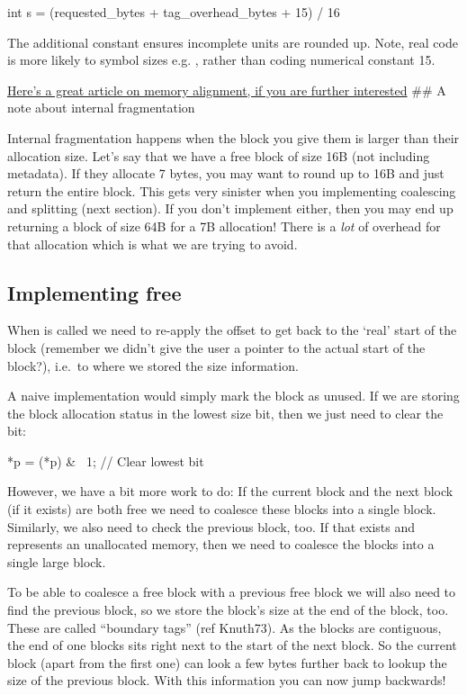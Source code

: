 \begin{code}[language=C]
int s = (requested_bytes + tag_overhead_bytes + 15) / 16
\end{code}

The additional constant ensures incomplete units are rounded up. Note, real code is more likely to symbol sizes e.g. , rather than coding numerical constant 15.

\href{http://www.ibm.com/developerworks/library/pa-dalign/}{Here's a great article on memory alignment, if you are further interested} \#\# A note about internal fragmentation

Internal fragmentation happens when the block you give them is larger than their allocation size. Let's say that we have a free block of size 16B (not including metadata). If they allocate 7 bytes, you may want to round up to 16B and just return the entire block. This gets very sinister when you implementing coalescing and splitting (next section). If you don't implement either, then you may end up returning a block of size 64B for a 7B allocation! There is a \emph{lot} of overhead for that allocation which is what we are trying to avoid.

\subsection{Implementing free}

When  is called we need to re-apply the offset to get back to the `real' start of the block (remember we didn't give the user a pointer to the actual start of the block?), i.e.~to where we stored the size information.

A naive implementation would simply mark the block as unused. If we are storing the block allocation status in the lowest size bit, then we just need to clear the bit:

\begin{code}[language=C]
*p = (*p) & ~1; // Clear lowest bit 
\end{code}

However, we have a bit more work to do: If the current block and the next block (if it exists) are both free we need to coalesce these blocks into a single block. Similarly, we also need to check the previous block, too. If that exists and represents an unallocated memory, then we need to coalesce the blocks into a single large block.

To be able to coalesce a free block with a previous free block we will also need to find the previous block, so we store the block's size at the end of the block, too. These are called ``boundary tags'' (ref Knuth73). As the blocks are contiguous, the end of one blocks sits right next to the start of the next block. So the current block (apart from the first one) can look a few bytes further back to lookup the size of the previous block. With this information you can now jump backwards!

